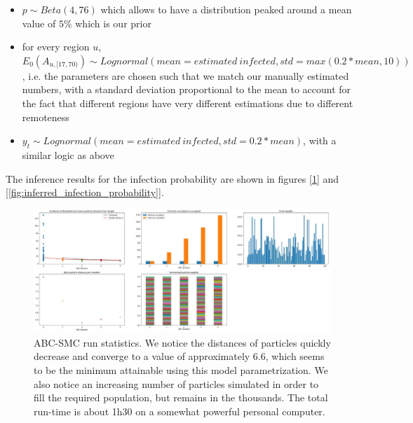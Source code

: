 \documentclass[11pt]{article}
\begin{document}
\begin{itemize}
\item $p \sim Beta(4, 76)$ which allows to have a distribution peaked around a mean value of $5\%$ which is our prior
\item for every region $u$, $E_0(A_{u,[17, 70)}) \sim Lognormal(mean=estimated \ infected, std=max(0.2 * mean, 10))$, i.e. the parameters are chosen such that we match our manually estimated numbers, with a standard deviation proportional to the mean to account for the fact that different regions have very different estimations due to different remoteness
\item $y_t \sim Lognormal(mean=estimated \ infected, std=0.2 * mean)$, with a similar logic as above
\end{itemize}

The inference results for the infection probability are shown in figures [\ref{fig:abcsmc_statistics}] and [\ref{fig:inferred_infection_probability}].

\begin{figure}
  \includegraphics[width=\linewidth, scale=1]{images/abcsmc_statistics.jpg}
  \caption{ABC-SMC run statistics. We notice the distances of particles quickly decrease and converge to a value of approximately 6.6, which seems to be the minimum attainable using this model parametrization. We also notice an increasing number of particles simulated in order to fill the required population, but remains in the thousands. The total run-time is about 1h30 on a somewhat powerful personal computer.}
  \label{fig:abcsmc_statistics}
\end{figure}
\end{document}
